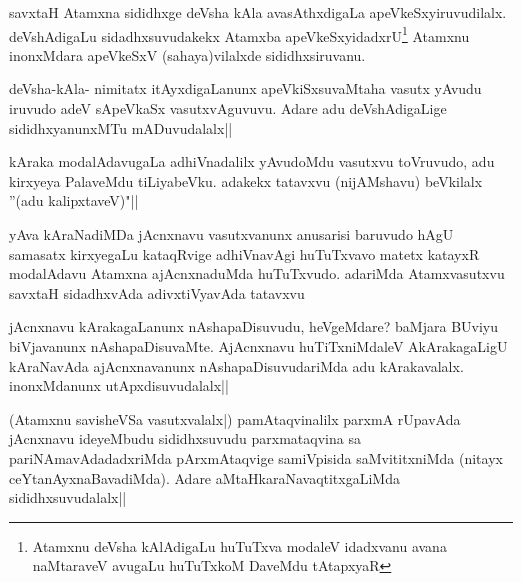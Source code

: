 \begin{artha}
savxtaH Atamxna sididhxge deVsha kAla avasAthxdigaLa apeVkeSxyiruvudilalx. deVshAdigaLu sidadhxsuvudakekx Atamxba apeVkeSxyidadxrU\footnote[1]{Atamxnu deVsha kAlAdigaLu huTuTxva modaleV idadxvanu avana naMtaraveV avugaLu huTuTxkoM\- DaveMdu tAtapxyaR} Atamxnu inonxMdara apeVkeSxV (sahaya)vilalxde sididhxsiruvanu.
\end{artha}


\begin{artha}
deVsha-kAla- nimitatx itAyxdigaLanunx apeVkiSxsuvaMtaha vasutx yAvudu iruvudo adeV sApeVkaSx vasutxvAguvuvu. Adare adu deVshAdigaLige sididhxyanunxMTu mADuvudalalx||
\end{artha}


\begin{artha}
kAraka modalAdavugaLa adhiVnadalilx yAvudoMdu vasutxvu toVruvudo, adu kirxyeya PalaveMdu tiLiyabeVku. adakekx tatavxvu (nijAMshavu) beVkilalx ''(adu kalipxtaveV)"||
\end{artha}


\begin{artha}
yAva kAraNadiMDa jAcnxnavu vasutxvanunx anusarisi baruvudo hAgU samasatx kirxyegaLu kataqRvige adhiVnavAgi huTuTxvavo matetx katayxR modalAdavu Atamxna ajAcnxnaduMda huTuTxvudo. adariMda Atamxvasutxvu savxtaH sidadhxvAda adivxtiVyavAda tatavxvu 
\end{artha}

\begin{artha}
jAcnxnavu kArakagaLanunx nAshapaDisuvudu, heVgeMdare? baMjara BUviyu biVjavanunx nAshapaDisuvaMte. AjAcnxnavu huTiTxniMdaleV AkArakagaLigU kAraNavAda ajAcnxnavanunx nAshapaDisuvudariMda adu kArakavalalx. inonxMdanunx utApxdisuvudalalx||
\end{artha}

\begin{artha}%
(Atamxnu savisheVSa vasutxvalalx|) pamAtaqvinalilx parxmA rUpavAda jAcnxnavu ideyeMbudu sididhxsuvudu parxmataqvina sa pariNAmavAdadadxriMda pArxmAtaqvige samiVpisida saMvititxniMda (nitayx ceYtanAyxnaBavadiMda). Adare aMtaHkaraNavaqtitxgaLiMda sididhxsuvudalalx||
\end{artha}

